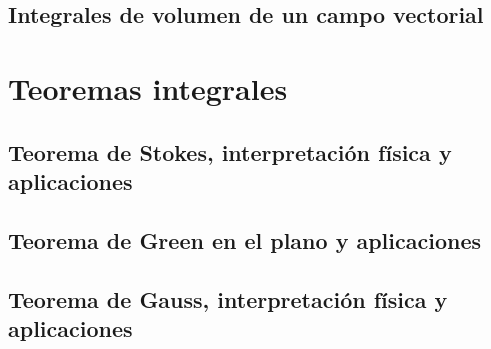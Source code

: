 \documentclass[12pt,openany]{book}
\begin{document}
		\subsection{Integrales de volumen de un campo vectorial}

	\section{Teoremas integrales}

	   \subsection{Teorema de Stokes, interpretaci\'on f\'isica y aplicaciones}
		
	   \subsection{Teorema de Green en el plano y aplicaciones}

	   \subsection{Teorema de Gauss, interpretaci\'on f\'isica y aplicaciones}
\end{document}
